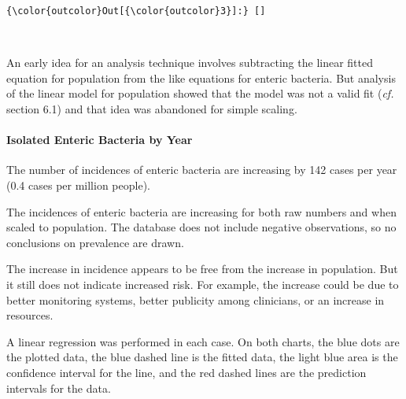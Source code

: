 \documentclass[11pt]{article}
\begin{document}
\begin{Verbatim}[commandchars=\\\{\}]
{\color{outcolor}Out[{\color{outcolor}3}]:} []
\end{Verbatim}
            
    \begin{center}
    \end{center}
    { \hspace*{\fill} \\}
    
    An early idea for an analysis technique involves subtracting the linear
fitted equation for population from the like equations for enteric
bacteria. But analysis of the linear model for population showed that
the model was not a valid fit (\emph{cf.} section 6.1) and that idea was
abandoned for simple scaling.

    \hypertarget{isolated-enteric-bacteria-by-year}{%
\paragraph{Isolated Enteric Bacteria by
Year}\label{isolated-enteric-bacteria-by-year}}

    The number of incidences of enteric bacteria are increasing by 142 cases
per year (0.4 cases per million people).

The incidences of enteric bacteria are increasing for both raw numbers
and when scaled to population. The database does not include negative
observations, so no conclusions on prevalence are drawn.

The increase in incidence appears to be free from the increase in
population. But it still does not indicate increased risk. For example,
the increase could be due to better monitoring systems, better publicity
among clinicians, or an increase in resources.

A linear regression was performed in each case. On both charts, the blue
dots are the plotted data, the blue dashed line is the fitted data, the
light blue area is the confidence interval for the line, and the red
dashed lines are the prediction intervals for the data.
\end{document}
